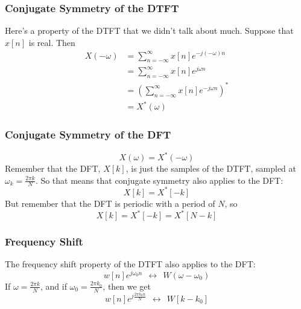\documentclass{beamer}
\begin{document}
\begin{frame}
  \frametitle{Conjugate Symmetry of the DTFT}

  Here's a property of the DTFT that we didn't talk about much.
  Suppose that $x[n]$ is real.  Then
  \begin{align*}
    X(-\omega) &= \sum_{n=-\infty}^\infty x[n]e^{-j(-\omega)n}\\
    &= \sum_{n=-\infty}^\infty x[n]e^{j\omega n}\\
    &= \left(\sum_{n=-\infty}^\infty x[n]e^{-j\omega n}\right)^*\\
    &= X^*(\omega)
  \end{align*}
  
\end{frame}  

\begin{frame}
  \frametitle{Conjugate Symmetry of the DFT}

  \begin{displaymath}
    X(\omega) = X^*(-\omega)
  \end{displaymath}
  Remember that the DFT, $X[k]$, is just the samples of the DTFT,
  sampled at $\omega_k=\frac{2\pi k}{N}$.  So that means that
  conjugate symmetry also applies to the DFT:
  \begin{displaymath}
    X[k] = X^*[-k]
  \end{displaymath}
  But remember that the DFT is periodic with a period of $N$, so
  \begin{displaymath}
    X[k] = X^*[-k] = X^*[N-k]
  \end{displaymath}
\end{frame}


\begin{frame}
  \frametitle{Frequency Shift}

  The frequency shift property of the DTFT also applies to the DFT:
  \begin{displaymath}
    w[n]e^{j\omega_0 n}~~\leftrightarrow~~W(\omega-\omega_0)
  \end{displaymath}
  If $\omega=\frac{2\pi k}{N}$, and if $\omega_0=\frac{2\pi k_0}{N}$,
  then we get
  \begin{displaymath}
    w[n]e^{j\frac{2\pi k_0 n}{N}} ~~\leftrightarrow~~W[k-k_0]
  \end{displaymath}
\end{frame}
\end{document}
